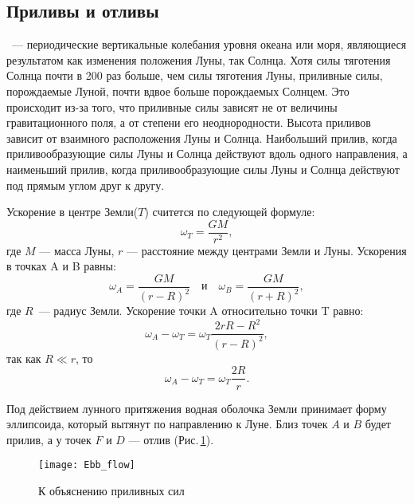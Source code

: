 \subsection{Приливы и отливы}

~--- периодические вертикальные колебания уровня океана или моря, являющиеся результатом как изменения положения Луны, так Солнца. Хотя силы тяготения Солнца почти в 200 раз больше, чем силы тяготения Луны, приливные силы, порождаемые Луной, почти вдвое больше порождаемых Солнцем. Это происходит из-за того, что приливные силы зависят не от величины гравитационного поля, а от степени его неоднородности. Высота приливов зависит от взаимного расположения Луны и Солнца. Наибольший прилив, когда приливообразующие силы Луны и Солнца действуют вдоль одного направления, а наименьший прилив, когда приливообразующие силы Луны и Солнца действуют под прямым углом друг к другу.

Ускорение в центре Земли($T$) считется по следующей формуле: \begin{equation}\omega_T=\frac{GM}{r^2},
\end{equation}
где $M$ --- масса Луны, $r$ --- расстояние между центрами Земли и Луны. Ускорения в точках A и B равны: \begin{equation}
\omega_A = \frac{GM}{(r - R)^2} \quad \text{и} \quad \omega_B = \frac{GM}{(r + R)^2},
\end{equation}
где $R$~--- радиус Земли. Ускорение точки A относительно точки T равно:\begin{equation}
\omega_A - \omega_T = \omega_T \frac{2 r R - R^2}{(r - R)^2},
\end{equation}
так как $R\ll r$, то \begin{equation}
\omega_A - \omega_T = \omega_T \frac{2 R}{r}.
\end{equation}

Под действием лунного притяжения водная оболочка Земли принимает форму 
эллипсоида, который вытянут по направлению к Луне. Близ точек $A$ и $B$ будет 
прилив, а у точек $F$ и $D$ --- отлив (Рис.\,\ref{Ebb_flow}).
\begin{figure}[h!]
\centering
\texttt{[image: Ebb\_flow]}
\caption{К объяснению приливных сил}\label{Ebb_flow}
\end{figure}


